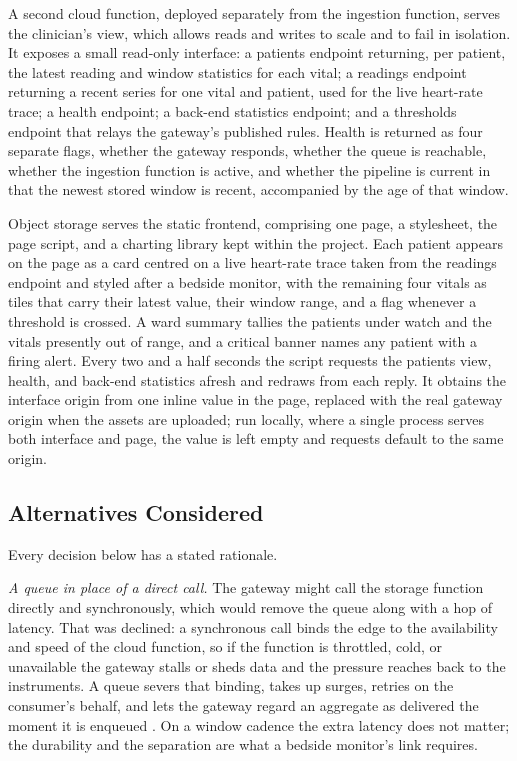 \documentclass[conference]{IEEEtran}
\begin{document}
A second cloud function, deployed separately from the ingestion function, serves the clinician's view, which allows reads and writes to scale and to fail in isolation. It exposes a small read-only interface: a patients endpoint returning, per patient, the latest reading and window statistics for each vital; a readings endpoint returning a recent series for one vital and patient, used for the live heart-rate trace; a health endpoint; a back-end statistics endpoint; and a thresholds endpoint that relays the gateway's published rules. Health is returned as four separate flags, whether the gateway responds, whether the queue is reachable, whether the ingestion function is active, and whether the pipeline is current in that the newest stored window is recent, accompanied by the age of that window.

Object storage serves the static frontend, comprising one page, a stylesheet, the page script, and a charting library kept within the project. Each patient appears on the page as a card centred on a live heart-rate trace taken from the readings endpoint and styled after a bedside monitor, with the remaining four vitals as tiles that carry their latest value, their window range, and a flag whenever a threshold is crossed. A ward summary tallies the patients under watch and the vitals presently out of range, and a critical banner names any patient with a firing alert. Every two and a half seconds the script requests the patients view, health, and back-end statistics afresh and redraws from each reply. It obtains the interface origin from one inline value in the page, replaced with the real gateway origin when the assets are uploaded; run locally, where a single process serves both interface and page, the value is left empty and requests default to the same origin.

\subsection{Alternatives Considered}

Every decision below has a stated rationale.

\textit{A queue in place of a direct call.} The gateway might call the storage function directly and synchronously, which would remove the queue along with a hop of latency. That was declined: a synchronous call binds the edge to the availability and speed of the cloud function, so if the function is throttled, cold, or unavailable the gateway stalls or sheds data and the pressure reaches back to the instruments. A queue severs that binding, takes up surges, retries on the consumer's behalf, and lets the gateway regard an aggregate as delivered the moment it is enqueued \cite{hohpe2003}. On a window cadence the extra latency does not matter; the durability and the separation are what a bedside monitor's link requires.
\end{document}
